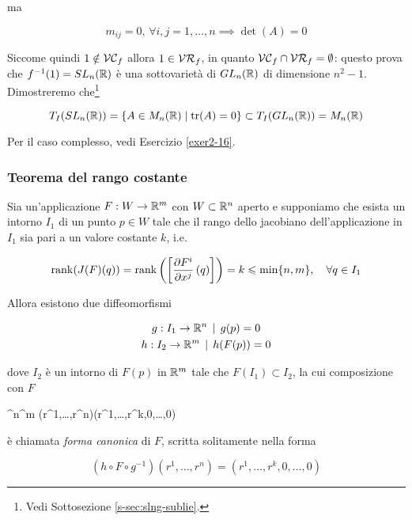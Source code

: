 ma

\begin{equation}
	m_{ij} = 0, \, \forall i,j=1,\dots,n \implies \det(A) = 0
\end{equation}

Siccome quindi $ 1 \notin \mathcal{VC}_{f} $ allora $ 1 \in \mathcal{VR}_{f} $, in quanto $ \mathcal{VC}_{f} \cap \mathcal{VR}_{f} = \emptyset $: questo prova che $ f^{-1}(1) = SL_{n}(\mathbb{R}) $ è una sottovarietà di $ GL_{n}(\mathbb{R}) $ di dimensione $ n^{2}-1 $. \\
Dimostreremo che\footnote{%
	Vedi Sottosezione \ref{s-sec:slng-sublie}.}

\begin{equation}
	T_{I}(SL_{n}(\mathbb{R})) = \{ A \in M_{n}(\mathbb{R}) \mid \tr(A)=0 \} \subset T_{I}(GL_{n}(\mathbb{R})) = M_{n}(\mathbb{R})
\end{equation}

Per il caso complesso, vedi Esercizio \ref{exer2-16}.

\subsubsection{Teorema del rango costante}

\begin{theorem}
	Sia un'applicazione $ F : W \to \mathbb{R}^{m} $ con $ W \subset \mathbb{R}^{n} $ aperto e supponiamo che esista un intorno $ I_{1} $ di un punto $ p \in W $ tale che il rango dello jacobiano dell'applicazione in $ I_{1} $ sia pari a un valore costante $ k $, i.e.
	
	\begin{equation}
		\rank(J(F)(q)) = \rank \left( \left[ \pdv{F^{i}}{x^{j}} \, (q) \right] \right) = k \leqslant \min\{n,m\} \qcomma \forall q \in I_{1}
	\end{equation}

	Allora esistono due diffeomorfismi
	
	\begin{gather}
		g : I_{1} \to \mathbb{R}^{n} \, \mid \, g(p) = 0 \\
		h : I_{2} \to \mathbb{R}^{m} \, \mid \, h(F(p)) = 0
	\end{gather}
	
	dove $ I_{2} $ è un intorno di $ F(p) $ in $ \mathbb{R}^{m} $ tale che $ F(I_{1}) \subset I_{2} $, la cui composizione con $ F $
	
		{\R^{n}}{\R^{m}}
		{(r^{1},\dots,r^{n})}{(r^{1},\dots,r^{k},0,\dots,0)}

	è chiamata \textit{forma canonica} di $ F $, scritta solitamente nella forma
	
	\begin{equation}
		(h \circ F \circ g^{-1})(r^{1},\dots,r^{n}) = (r^{1},\dots,r^{k},0,\dots,0)
	\end{equation}
	
\end{theorem}

